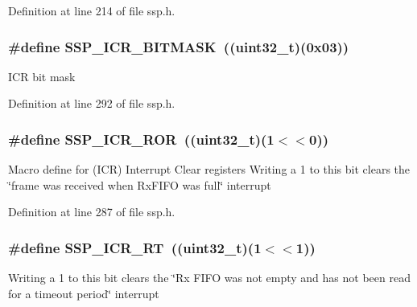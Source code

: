 Definition at line 214 of file ssp.\+h.

\subsubsection[{\texorpdfstring{S\+S\+P\+\_\+\+I\+C\+R\+\_\+\+B\+I\+T\+M\+A\+SK}{SSP_ICR_BITMASK}}]{\setlength{\rightskip}{0pt plus 5cm}\#define S\+S\+P\+\_\+\+I\+C\+R\+\_\+\+B\+I\+T\+M\+A\+SK~(({\bf uint32\+\_\+t})(0x03))}\hypertarget{group___s_s_p___private___macros_ga5ce108586bfd5b77c849aa9969c8973c}{}\label{group___s_s_p___private___macros_ga5ce108586bfd5b77c849aa9969c8973c}
I\+CR bit mask 

Definition at line 292 of file ssp.\+h.

\subsubsection[{\texorpdfstring{S\+S\+P\+\_\+\+I\+C\+R\+\_\+\+R\+OR}{SSP_ICR_ROR}}]{\setlength{\rightskip}{0pt plus 5cm}\#define S\+S\+P\+\_\+\+I\+C\+R\+\_\+\+R\+OR~(({\bf uint32\+\_\+t})(1$<$$<$0))}\hypertarget{group___s_s_p___private___macros_ga12339c82c252077d3c53bad546a68c75}{}\label{group___s_s_p___private___macros_ga12339c82c252077d3c53bad546a68c75}
Macro define for (I\+CR) Interrupt Clear registers Writing a 1 to this bit clears the \char`\"{}frame was received when
\+Rx\+F\+I\+F\+O was full\char`\"{} interrupt 

Definition at line 287 of file ssp.\+h.

\subsubsection[{\texorpdfstring{S\+S\+P\+\_\+\+I\+C\+R\+\_\+\+RT}{SSP_ICR_RT}}]{\setlength{\rightskip}{0pt plus 5cm}\#define S\+S\+P\+\_\+\+I\+C\+R\+\_\+\+RT~(({\bf uint32\+\_\+t})(1$<$$<$1))}\hypertarget{group___s_s_p___private___macros_ga6917b6687bd6c914134afe3d86b10fb0}{}\label{group___s_s_p___private___macros_ga6917b6687bd6c914134afe3d86b10fb0}
Writing a 1 to this bit clears the \char`\"{}\+Rx F\+I\+F\+O was not empty and
has not been read for a timeout period\char`\"{} interrupt 

